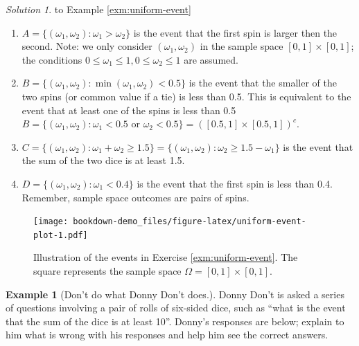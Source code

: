\documentclass[
]{book}
\providecommand{\tightlist}{%
  \setlength{\itemsep}{0pt}\setlength{\parskip}{0pt}}
\theoremstyle{definition}
\theoremstyle{definition}
\newtheorem{example}{Example}[chapter]
\theoremstyle{definition}
\theoremstyle{remark}
\newtheorem*{solution}{Solution}
\begin{document}
\begin{solution}
{}
to Example \ref{exm:uniform-event}
\end{solution}

\begin{enumerate}
\def\labelenumi{\arabic{enumi}.}
\tightlist
\item
  \(A = \{(\omega_1, \omega_2): \omega_1>\omega_2\}\) is the event that the first spin is larger then the second. Note: we only consider \((\omega_1, \omega_2)\) in the sample space \([0, 1]\times[0,1]\); the conditions \(0\le \omega_1 \le 1, 0\le \omega_2 \le 1\) are assumed.\\
\item
  \(B = \{(\omega_1, \omega_2): \min(\omega_1,\omega_2)<0.5\}\) is the event that the smaller of the two spins (or common value if a tie) is less than 0.5. This is equivalent to the event that at least one of the spins is less than 0.5 \(B = \{(\omega_1, \omega_2): \omega_1<0.5 \text{ or } \omega_2<0.5\} = ([0.5, 1]\times[0.5, 1])^c\).
\item
  \(C = \{(\omega_1, \omega_2): \omega_1+\omega_2\ge 1.5\} = \{(\omega_1, \omega_2): \omega_2\ge 1.5-\omega_1\}\) is the event that the sum of the two dice is at least 1.5.
\item
  \(D = \{(\omega_1, \omega_2): \omega_1<0.4\}\) is the event that the first spin is less than 0.4. Remember, sample space outcomes are pairs of spins.
\end{enumerate}



\begin{figure}
\centering
\texttt{[image: bookdown-demo\_files/figure-latex/uniform-event-plot-1.pdf]}
\caption{\label{fig:uniform-event-plot}Illustration of the events in Exercise \ref{exm:uniform-event}. The square represents the sample space \(\Omega=[0,1]\times[0,1]\).}
\end{figure}

\begin{example}[Don't do what Donny Don't does.]
\protect\hypertarget{exm:dd-event}{}{\label{exm:dd-event} {} }Donny Don't is asked a series of questions involving a pair of rolls of six-sided dice, such as ``what is the event that the sum of the dice is at least 10''. Donny's responses are below; explain to him what is wrong with his responses and help him see the correct answers.
\end{example}
\end{document}
